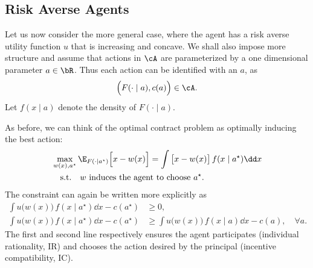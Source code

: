 

\subsection{Risk Averse Agents}
Let us now consider the more general case, where the agent has a risk averse utility function \(u\) that is increasing and concave.
We shall also impose more structure and assume that actions in \(\cA\) are parameterized by a one dimensional parameter \(a \in \bR\).
Thus each action can be identified with an \(a\), as
\[
  \Big(F(\cdot \mid a), c(a)\Big) \in \cA.
\]
Let \(f(x \mid a)\) denote the density of \(F(\cdot \mid a)\).


As before, we can think of the optimal contract problem as optimally inducing the best action:
\begin{align*}
  &\max_{w(x), a^\star} \E_{F(\cdot \mid a^\star)}\Big[ x - w(x) \Big]
  = \int \big[x - w(x)\big] \,f(x \mid a^\star) \dd x \\
  &\quad\text{s.t.}\quad w \text{ induces the agent to choose \(a^\star\)}.
\end{align*}
The constraint can again be written more explicitly as
\begin{align*}
  \int u\big(w(x)\big) \,f(x \mid a^\star) \dd x - c(a^\star)
  &\geq 0, \\
  \int u\big(w(x)\big) \,f(x \mid a^\star) \dd x - c(a^\star)
  &\geq \int u\big(w(x)\big) \,f(x \mid a) \dd x - c(a), \quad \forall a.
\end{align*}
The first and second line respectively ensures the agent participates (individual rationality, IR) and chooses the action desired by the principal (incentive compatibility, IC).

